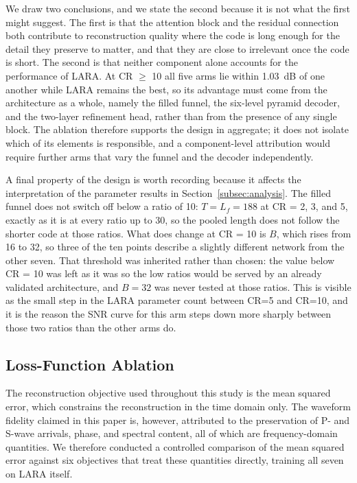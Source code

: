 \documentclass[fleqn,10pt]{wlscirep}
\begin{document}
We draw two conclusions, and we state the second because it is not what the first might suggest. The first is that the attention block and the residual connection both contribute to reconstruction quality where the code is long enough for the detail they preserve to matter, and that they are close to irrelevant once the code is short. The second is that neither component alone accounts for the performance of LARA. At CR $\geq$ 10 all five arms lie within 1.03~dB of one another while LARA remains the best, so its advantage must come from the architecture as a whole, namely the filled funnel, the six-level pyramid decoder, and the two-layer refinement head, rather than from the presence of any single block. The ablation therefore supports the design in aggregate; it does not isolate which of its elements is responsible, and a component-level attribution would require further arms that vary the funnel and the decoder independently.

A final property of the design is worth recording because it affects the interpretation of the parameter results in Section~\ref{subsec:analysis}. The filled funnel does not switch off below a ratio of 10: $T = L_{f} = 188$ at CR = 2, 3, and 5, exactly as it is at every ratio up to 30, so the pooled length does not follow the shorter code at those ratios. What does change at CR = 10 is $B$, which rises from 16 to 32, so three of the ten points describe a slightly different network from the other seven. That threshold was inherited rather than chosen: the value below CR = 10 was left as it was so the low ratios would be served by an already validated architecture, and $B = 32$ was never tested at those ratios. This is visible as the small step in the LARA parameter count between CR=5 and CR=10, and it is the reason the SNR curve for this arm steps down more sharply between those two ratios than the other arms do.

\subsection{Loss-Function Ablation}
\label{subsec:loss-ablation}

The reconstruction objective used throughout this study is the mean squared error, which constrains the reconstruction in the time domain only. The waveform fidelity claimed in this paper is, however, attributed to the preservation of P- and S-wave arrivals, phase, and spectral content, all of which are frequency-domain quantities. We therefore conducted a controlled comparison of the mean squared error against six objectives that treat these quantities directly, training all seven on LARA itself.
\end{document}
